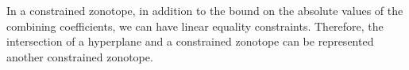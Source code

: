 In a constrained zonotope, in addition to the bound on the absolute
values of the combining coefficients, we can have linear equality
constraints.  Therefore, the intersection of a hyperplane and a constrained
zonotope can be represented another constrained zonotope.
%
\begin{definition}

\end{definition}
%
